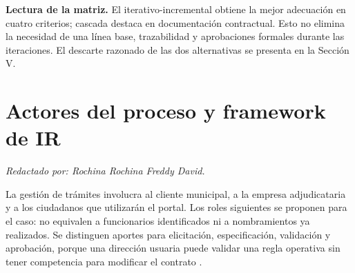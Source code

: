 \documentclass[conference,onecolumn]{IEEEtran}
\begin{document}
\noindent\textbf{Lectura de la matriz.} El iterativo-incremental obtiene la mejor adecuación en cuatro criterios; cascada destaca en documentación contractual. Esto no elimina la necesidad de una línea base, trazabilidad y aprobaciones formales durante las iteraciones. El descarte razonado de las dos alternativas se presenta en la Sección V.

\section{Actores del proceso y framework de IR}
\noindent\textit{Redactado por: Rochina Rochina Freddy David.}\par\smallskip


La gestión de trámites involucra al cliente municipal, a la empresa adjudicataria y a los ciudadanos que utilizarán el portal. Los roles siguientes se proponen para el caso: no equivalen a funcionarios identificados ni a nombramientos ya realizados. Se distinguen aportes para elicitación, especificación, validación y aprobación, porque una dirección usuaria puede validar una regla operativa sin tener competencia para modificar el contrato \cite{pohl2025,buhne2026}.
\end{document}
